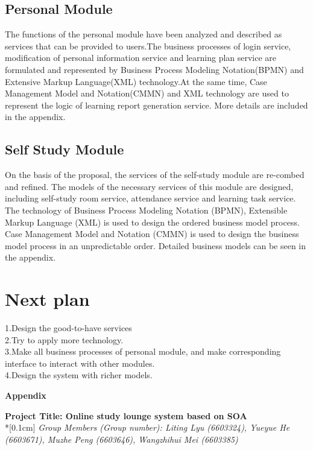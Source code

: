 \documentclass[runningheads]{llncs}
\begin{document}
\subsection{Personal Module}%
The functions of the personal module have been analyzed and described as services that can be provided to users.The business processes of login service, modification of personal information service and learning plan service are formulated and represented by Business Process Modeling Notation(BPMN) and Extensive Markup Language(XML) technology.At the same time, Case Management Model and Notation(CMMN) and XML technology are used to represent the logic of learning report generation service. More details are included in the appendix.


\subsection{Self Study Module} %
On the basis of the proposal, the services of the self-study module are re-combed and refined. The models of the necessary services of this module are designed, including self-study room service, attendance service and learning task service. The technology of Business Process Modeling Notation (BPMN), Extensible Markup Language (XML) is used to design the ordered business model process. Case Management Model and Notation (CMMN) is used to design the business model process in an unpredictable order. Detailed business models can be seen in the appendix.

\section*{Next plan}
1.Design the good-to-have services
\\2.Try to apply more technology.
\\3.Make all business processes of personal module, and make corresponding interface to interact with other modules.
\\4.Design the system with richer models.

\clearpage
\begin{flushleft}
    \huge{\textbf{Appendix}}
\end{flushleft}
\begin{center}
    \Large{\textbf{Project Title: Online study lounge system based on SOA }} \\*[0.1cm]%
    \large{\emph{Group Members (Group number): Liting Lyu (6603324), Yueyue  He (6603671), Muzhe Peng (6603646), Wangzhihui Mei (6603385)}} %
\end{center}
    
\end{document}
